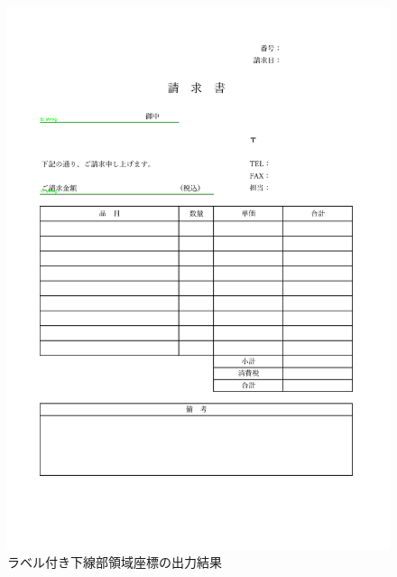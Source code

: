 \begin{figure}[t]
    \begin{center}
        \includegraphics[width=15cm]{image/05-indication/underlines_with_label.png}
        \caption{ラベル付き下線部領域座標の出力結果}
        \label{fig:underlines_with_label}
    \end{center}
\end{figure}
